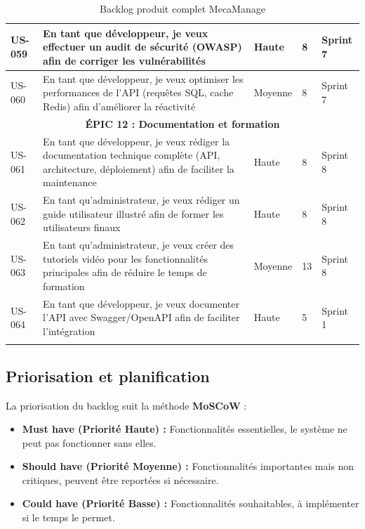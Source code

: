 \begin{longtable}{|p{1cm}|p{5.5cm}|p{1.8cm}|p{1.5cm}|p{1.5cm}|}
US-059 & En tant que développeur, je veux effectuer un audit de sécurité (OWASP) afin de corriger les vulnérabilités & Haute & 8 & Sprint 7 \\
\hline

US-060 & En tant que développeur, je veux optimiser les performances de l'API (requêtes SQL, cache Redis) afin d'améliorer la réactivité & Moyenne & 8 & Sprint 7 \\
\hline

\multicolumn{5}{|c|}{\cellcolor{gray!20}\textbf{ÉPIC 12 : Documentation et formation}} \\
\hline

US-061 & En tant que développeur, je veux rédiger la documentation technique complète (API, architecture, déploiement) afin de faciliter la maintenance & Haute & 8 & Sprint 8 \\
\hline

US-062 & En tant qu'administrateur, je veux rédiger un guide utilisateur illustré afin de former les utilisateurs finaux & Haute & 8 & Sprint 8 \\
\hline

US-063 & En tant qu'administrateur, je veux créer des tutoriels vidéo pour les fonctionnalités principales afin de réduire le temps de formation & Moyenne & 13 & Sprint 8 \\
\hline

US-064 & En tant que développeur, je veux documenter l'API avec Swagger/OpenAPI afin de faciliter l'intégration & Haute & 5 & Sprint 1 \\
\hline

\caption{Backlog produit complet MecaManage}
\end{longtable}

\subsection{Priorisation et planification}

La priorisation du backlog suit la méthode \textbf{MoSCoW} :

\begin{itemize}
    \item \textbf{Must have (Priorité Haute) :} Fonctionnalités essentielles, le système ne peut pas fonctionner sans elles.
    
    \item \textbf{Should have (Priorité Moyenne) :} Fonctionnalités importantes mais non critiques, peuvent être reportées si nécessaire.
    
    \item \textbf{Could have (Priorité Basse) :} Fonctionnalités souhaitables, à implémenter si le temps le permet.
\end{itemize}


